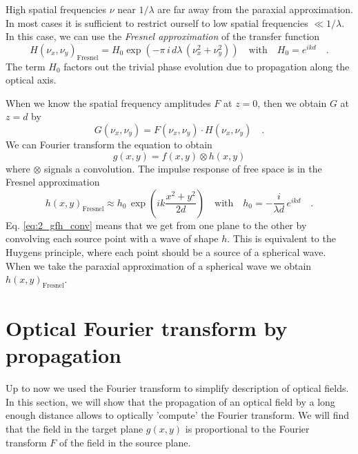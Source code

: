 High spatial frequencies $\nu$ near $1/\lambda$ are far away from the paraxial approximation. In most cases it is sufficient to restrict ourself to low spatial frequencies $ \ll 1/\lambda$. In this case, we can use the \emph{Fresnel approximation} of the transfer function
\begin{equation}
    H(\nu_x, \nu_y)_\text{Fresnel} = H_0 \exp \left(  
    -  \pi \, i  \, d \lambda \, (
 \nu_x^2 + \nu_y^2 )
    \right) \quad \text{with} \quad H_0 = e^{i k d} \quad . \label{eq:3_transfer_free_space}
\end{equation}
The term $H_0$ factors out the trivial phase evolution due to propagation along the optical axis.

When we know the spatial frequency amplitudes $F$ at $z=0$, then we obtain $G$ at $z=d$ by
\begin{equation}
    G(\nu_x, \nu_y) =  F(\nu_x, \nu_y) \cdot  H(\nu_x, \nu_y) \quad .
\end{equation}
We can Fourier transform the equation to obtain 
\begin{equation}
    g(x,y) = f(x,y) \otimes h(x,y) \label{eq:2_gfh_conv}
\end{equation}
where $\otimes$ signals a convolution. The impulse response of free space is in the Fresnel approximation
\begin{equation}
    h(x,y)_\text{Fresnel} \approx h_0 \, \exp \left(i k \frac{x^2 + y^2 }{2d} \right) \quad \text{with} \quad
    h_0 = -\frac{i}{\lambda d} \,  e^{i k d } \quad .
\end{equation}
Eq. \ref{eq:2_gfh_conv} means that we get from one plane to the other by convolving each source point with a wave of shape $h$. This is equivalent to the Huygens principle, where each point should be a source of a spherical wave. When we take the paraxial approximation of a spherical wave we obtain $ h(x,y)_\text{Fresnel}$.


\section{Optical Fourier transform by propagation}

Up to now we used the Fourier transform to simplify description of optical fields. In this section, we will show that the propagation of an optical field by a long enough distance allows to optically 'compute' the Fourier transform. We will find that the field in the target plane $g(x,y)$ is proportional to the Fourier transform $F$ of the field in the source plane.

